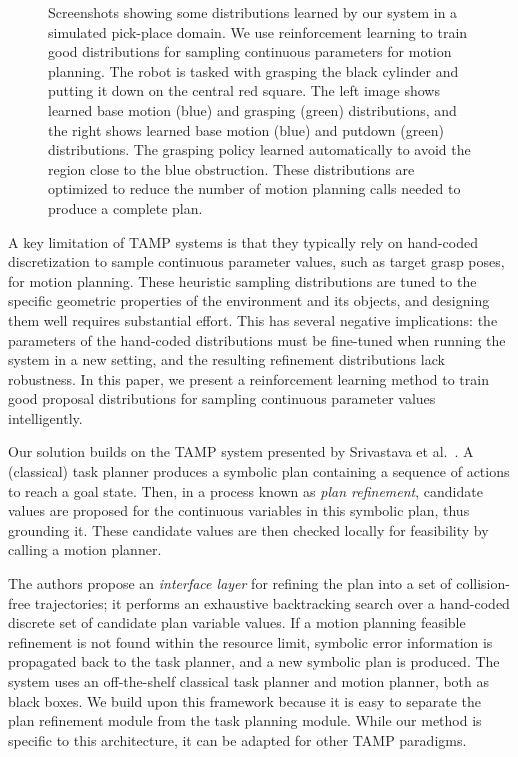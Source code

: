 \begin{figure}[h]
  \caption{Screenshots showing some distributions learned by our system in a simulated pick-place
    domain. We use reinforcement learning to train good distributions for sampling continuous parameters
    for motion planning. The robot is tasked with grasping the black cylinder and putting it down on the
    central red square. The left image shows learned base motion (blue) and grasping (green) distributions,
    and the right shows learned base motion (blue) and putdown (green) distributions. The grasping policy
    learned automatically to avoid the region close to the blue obstruction. These distributions are
    optimized to reduce the number of motion planning calls needed to produce a complete plan.}
  \label{fig:cover}
\end{figure}

A key limitation of TAMP systems is that they typically rely on hand-coded discretization to
sample continuous parameter values, such as target grasp poses, for motion planning.
These heuristic sampling distributions are tuned to the specific
geometric properties of the environment and its objects, and designing them well
requires substantial effort. This has several negative implications: the parameters of the
hand-coded distributions must be fine-tuned when running the system in a new setting, and the
resulting refinement distributions lack robustness. In this paper, we present a reinforcement
learning method to train good proposal distributions for sampling continuous parameter
values intelligently.

Our solution builds on the TAMP system
presented by Srivastava et al.~\cite{srivastava2014combined}.
A (classical) task planner produces a symbolic plan containing
a sequence of actions to reach a goal state. Then, in a process known as \emph{plan refinement},
candidate values are proposed for the continuous variables in this symbolic plan, thus grounding it.
These candidate values are then checked locally for feasibility by calling a motion planner.

The authors propose an \emph{interface layer} for refining the plan into a set
of collision-free trajectories; it performs an exhaustive
backtracking search over a hand-coded discrete set of candidate plan variable values. If a motion
planning feasible refinement is not found within the resource limit,
symbolic error information is propagated back to the task planner, and a new symbolic plan is produced.
The system uses an off-the-shelf classical task planner and motion planner, both as black boxes.
We build upon this framework because it is easy to separate the plan refinement module from the task planning module.
While our method is specific to this architecture, it can be adapted for other TAMP paradigms.

